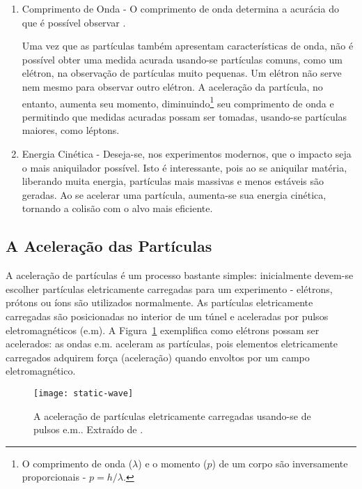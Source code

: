 \begin{enumerate}
\item Comprimento de Onda - O comprimento de onda determina a acurácia do que
é possível observar \cite{partadv}.

Uma vez que as par\-tí\-culas tam\-bém apresentam caracte\-rís\-ticas de onda,
não é pos\-sí\-vel obter uma medida acurada usando-se partículas comuns, como
um e\-lé\-tron, na observação de partículas muito pequenas. Um elétron não
serve nem mesmo para observar outro elétron. A aceleração da partícula, no
entanto, aumenta seu momento, diminuindo\footnote{O comprimento de onda
($\lambda$) e o momento ($p$) de um corpo são inversamente proporcionais -
$p=h/\lambda$.} seu comprimento de onda e permitindo que medidas acuradas
possam ser tomadas, usando-se partículas maiores, como léptons.

\item Energia Cinética - Deseja-se, nos experimentos modernos, que o impacto
seja o mais aniquilador possível. Isto é interessante, pois ao se aniquilar
matéria, liberando muita energia, partículas mais massivas e menos estáveis são
geradas. Ao se acelerar uma partícula, aumenta-se sua energia cinética,
tornando a colisão com o alvo mais eficiente.
\end{enumerate}

\subsection{A Aceleração das Partículas}

A aceleração de partículas  é um processo
bastante simples: inicialmente devem-se escolher partículas eletricamente
carregadas para um experimento - e\-lé\-trons, pró\-tons ou íons são
utilizados normalmente. As par\-tí\-culas eletricamente carregadas são
posicionadas no interior de um túnel e aceleradas por pulsos
eletromagnéticos (e.m). A
Figura~\ref{fig:acelera} exemplifica como elétrons possam ser acelerados: as
ondas e.m. aceleram as partículas, pois elementos eletricamente carregados
adquirem força (aceleração) quando envoltos por um campo eletromagnético.

\begin{figure}
\begin{center}
\texttt{[image: static-wave]}
\end{center}
\caption[A aceleração de partículas.]{A aceleração de partículas eletricamente
carregadas usando-se de pulsos e.m.. Extraído de \cite{partadv}.}
\label{fig:acelera}
\end{figure}

